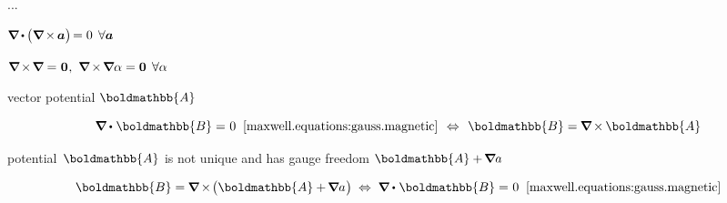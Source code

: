 ...


${\boldnabla \hspace{-0.1ex} \dotp \hspace{-0.1ex} \bigl( \boldnabla \hspace{-0.2ex} \times \hspace{-0.16ex} \bm{a} \bigr) \hspace{-0.3ex} = 0 \:\:\forall \bm{a}}$

${
\boldnabla \hspace{-0.2ex} \times \hspace{-0.28ex} \boldnabla = \hspace{.08ex} \zerovector
\hspace{.1ex} , \hspace{.33em}
\boldnabla \hspace{-0.15ex} \times \hspace{-0.25ex} \boldnabla \alpha = \zerovector \:\:\forall \alpha
}$

vector potential $\boldmathbb{A}$

\nopagebreak\[
\boldnabla \dotp \hspace{.12ex} \boldmathbb{B} = \hspace{.1ex} 0
\;\;\eqref{maxwell.equations:gauss.magnetic}
\hspace{.4em} \Leftrightarrow \hspace{.4em}
\boldmathbb{B} =  \hspace{-0.1ex} \boldnabla \hspace{-0.15ex} \times \hspace{-0.12ex} \boldmathbb{A}
\]

potential~${\boldmathbb{A}}$ is not unique and has gauge freedom ${\boldmathbb{A} + \hspace{-0.2ex} \boldnabla a}$

\[
\boldmathbb{B} =  \hspace{-0.1ex} \boldnabla \hspace{-0.15ex} \times \hspace{-0.3ex} \bigl( \boldmathbb{A} + \hspace{-0.2ex} \boldnabla a \hspace{.1ex} \bigr)
\hspace{.25em} \Leftrightarrow \hspace{.27em}
\boldnabla \dotp \hspace{.12ex} \boldmathbb{B} = \hspace{.1ex} 0
\;\;\eqref{maxwell.equations:gauss.magnetic}
\]

